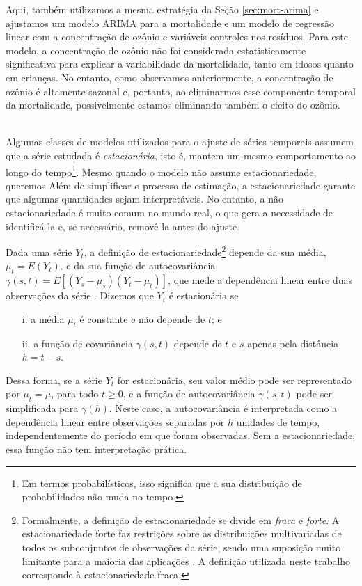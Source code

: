
Aqui, também utilizamos a mesma estratégia da Seção \ref{sec:mort-arima} e ajustamos um modelo ARIMA para a mortalidade e um modelo de regressão linear com a concentração de ozônio e variáveis controles nos resíduos. Para este modelo, a concentração de ozônio não foi considerada estatisticamente significativa para explicar a variabilidade da mortalidade, tanto em idosos quanto em crianças. No entanto, como observamos anteriormente, a concentração de ozônio é altamente sazonal e, portanto, ao eliminarmos esse componente temporal da mortalidade, possivelmente estamos eliminando também o efeito do ozônio.


\\
Algumas classes de modelos utilizados para o ajuste de séries temporais assumem que a série estudada é \textit{estacionária}, isto é, mantem um mesmo comportamento ao longo do tempo\footnote{Em termos probabilísticos, isso significa que a sua distribuição de probabilidades não muda no tempo.}. Mesmo quando o modelo não assume estacionariedade, queremos Além de simplificar o processo de estimação, a estacionariedade garante que algumas quantidades sejam interpretáveis. No entanto, a não estacionariedade é muito comum no mundo real, o que gera a necessidade de identificá-la e, se necessário, removê-la antes do ajuste.

Dada uma série $Y_t$, a definição de estacionariedade\footnote{Formalmente, a definição de estacionariedade se divide em \textit{fraca} e \textit{forte}. A estacionariedade forte faz restrições sobre as distribuições multivariadas de todos os subconjuntos de observações da série, sendo uma suposição muito limitante para a maioria das aplicações \citep{Shumway2006}. A definição utilizada neste trabalho corresponde à estacionariedade fraca.} depende da sua média, $\mu_t = E(Y_t)$, e da sua função de autocovariância, $\gamma(s,t) = E[(Y_s - \mu_s)(Y_t - \mu_t)]$, que mede a dependência linear entre duas observações da série \citep{Shumway2006}. Dizemos que $Y_t$ é estacionária se

\begin{itemize}
	\item[i.] a média $\mu_t$ é constante e não depende de $t$; e
	\item[ii.] a função de covariância $\gamma(s,t)$ depende de $t$ e $s$ apenas pela distância $h = t - s$.
\end{itemize}
Dessa forma, se a série $Y_t$ for estacionária, seu valor médio pode ser representado por $\mu_t = \mu$, para todo $t \geq 0$,  e a função de autocovariância $\gamma(s,t)$ pode ser simplificada para $\gamma(h)$. Neste caso, a autocovariância é interpretada como a dependência linear entre observações separadas por $h$ unidades de tempo, independentemente do período em que foram observadas. Sem a estacionariedade, essa função não tem interpretação prática. %



